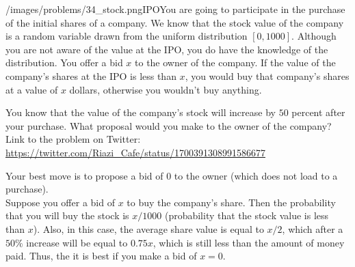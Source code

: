 \begin{problem}{/images/problems/34_stock.png}{IPO}You are going to participate in the purchase of the initial shares of a company. We know that the stock value of the company is a random variable drawn from the uniform distribution $[0,1000]$. Although you are not aware of the value at the IPO, you do have the knowledge of the distribution. You offer a bid $x$ to the owner of the company. If the value of the company's shares at the IPO is less than $x$, you would buy that company's shares at a value of $x$ dollars, otherwise you wouldn't buy anything.

You know that the value of the company's stock will increase by $50$ percent after your purchase. What proposal would you make to the owner of the company?\\[0.2cm]

Link to the problem on Twitter:  \url{https://twitter.com/Riazi_Cafe/status/1700391308991586677}\end{problem}
\begin{solution}
Your best move is to propose a bid of $0$ to the owner (which does not load to a purchase).\\[0.2cm]
	
Suppose you offer a bid of $x$ to buy the company's share. Then the probability that you will buy the stock is $x/1000$ (probability that the stock value is  less than $x$). Also, in this case, the average share value is equal to $x/2$, which after a $50\%$ increase will be equal to $0.75x$, which is still less than the amount of money paid. Thus, the it is best if you make a bid of $x=0$.
\end{solution}
